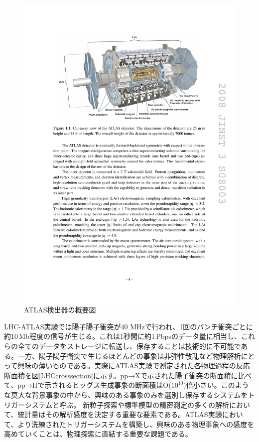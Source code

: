 \begin{figure} 
    \centering
    \includegraphics[width=16cm]{fig/Intro/ATLASdetector.pdf}
    \caption[ATLAS検出器の概要]{ATLAS検出器の概要図\cite{JINST:2008}}
    \label{ATLASdetector}
\end{figure}

LHC-ATLAS実験では陽子陽子衝突が40 MHzで行われ、1回のバンチ衝突ごとに約10\,Mb程度の信号が生じる。これは1秒間に約1\,Pbpsのデータ量に相当し、これらの全てのデータをストレージに転送し、保存することは技術的に不可能である。一方、陽子陽子衝突で生じるほとんどの事象は非弾性散乱など物理解析にとって興味の薄いものである。実際にATLAS実験で測定された各物理過程の反応断面積を図\ref{LHCcrosssection}に示す。pp→Xで示された陽子衝突の断面積に比べて、pp→Hで示されるヒッグス生成事象の断面積はO($10^10$)倍小さい。このような莫大な背景事象の中から、興味のある事象のみを選別し保存するシステムをトリガーシステムと呼ぶ。
新粒子探索や標準模型の精密測定の多くの解析において、統計量はその解析感度を決定する重要な要素である。ATLAS実験において、より洗練されたトリガーシステムを構築し、興味のある物理事象への感度を高めていくことは、物理探索に直結する重要な課題である。\par

